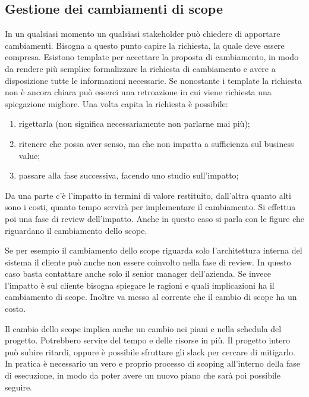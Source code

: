 \subsection{Gestione dei cambiamenti di scope}
In un qualsiasi momento un qualsiasi stakeholder può chiedere di apportare cambiamenti. Bisogna a questo punto capire la richiesta, la quale deve essere compresa. Esistono template per accettare la proposta di cambiamento, in modo da rendere più semplice formalizzare la richiesta di cambiamento e avere a disposizione tutte le informazioni necessarie. Se nonostante i template la richiesta non è ancora chiara può esserci una retroazione in cui viene richiesta una spiegazione migliore.
\noindent Una volta capita la richiesta è possibile:
\begin{enumerate}
	\item rigettarla (non significa necessariamente non parlarne mai più);
	\item ritenere che possa aver senso, ma che non impatta a sufficienza sul business value;
	\item passare alla fase successiva, facendo uno studio sull'impatto;
\end{enumerate}
Da una parte c'è l'impatto in termini di valore restituito, dall'altra quanto alti sono i costi, quanto tempo servirà per implementare il cambiamento. Si effettua poi una fase di review dell'impatto. Anche in questo caso si parla con le figure che riguardano il cambiamento dello scope.
\begin{info}
	Se per esempio il cambiamento dello scope riguarda solo l'architettura interna del sistema il cliente può anche non essere coinvolto nella fase di review. In questo caso basta contattare anche solo il senior manager dell'azienda.\newline
	\noindent Se invece l'impatto è sul cliente bisogna spiegare le ragioni e quali implicazioni ha il cambiamento di scope. Inoltre va messo al corrente che il cambio di scope ha un costo.
\end{info}
Il cambio dello scope implica anche un cambio nei piani e nella schedula del progetto. Potrebbero servire del tempo e delle risorse in più. Il progetto intero può subire ritardi, oppure è possibile sfruttare gli slack per cercare di mitigarlo. In pratica è necessario un vero e proprio processo di scoping all'interno della fase di esecuzione, in modo da poter avere un nuovo piano che sarà poi possibile seguire.


